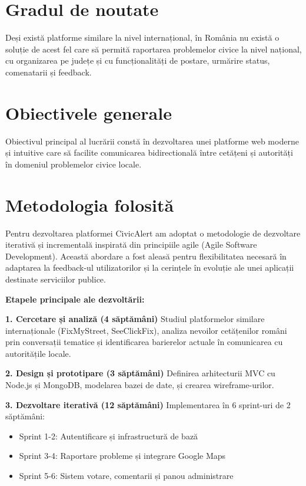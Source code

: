 \documentclass[12pt,a4paper]{report}
\begin{document}
\section*{Gradul de noutate}

Deși există platforme similare la nivel internațional, în România nu există o soluție de acest fel care să permită raportarea problemelor civice la nivel național, cu organizarea pe județe și cu funcționalități  de postare, urmărire status, comenatarii și feedback.

\section*{Obiectivele generale}

Obiectivul principal al lucrării constă în dezvoltarea unei platforme web moderne și intuitive care să facilite comunicarea bidirectională între cetățeni și autorități în domeniul problemelor civice locale.

\section*{Metodologia folosită}

Pentru dezvoltarea platformei CivicAlert am adoptat o metodologie de dezvoltare iterativă și incrementală  inspirată din principiile agile (Agile Software Development).  Această abordare a fost aleasă pentru flexibilitatea necesară în adaptarea la feedback-ul utilizatorilor și la cerințele în evoluție ale unei aplicații destinate serviciilor publice.

\textbf{Etapele principale ale dezvoltării:}

\textbf{1. Cercetare și analiză (4 săptămâni)}
Studiul platformelor similare internaționale (FixMyStreet, SeeClickFix), analiza nevoilor cetățenilor români prin conversații tematice și identificarea barierelor actuale în comunicarea cu autoritățile locale.

\textbf{2. Design și prototipare (3 săptămâni)}
Definirea arhitecturii MVC cu Node.js și MongoDB, modelarea bazei de date, și crearea wireframe-urilor.

\textbf{3. Dezvoltare iterativă (12 săptămâni)}
Implementarea în 6 sprint-uri de 2 săptămâni:
\begin{itemize}
\item Sprint 1-2: Autentificare și infrastructură de bază
\item Sprint 3-4: Raportare probleme și integrare Google Maps
\item Sprint 5-6: Sistem votare, comentarii și panou administrare
\end{itemize}
\end{document}
